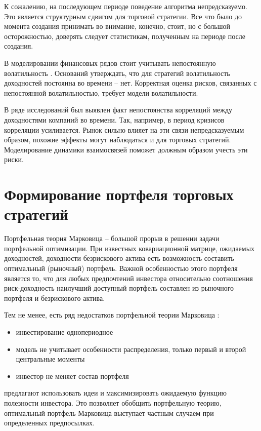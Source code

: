 К сожалению, на последующем периоде поведение алгоритма непредсказуемо. Это является структурным сдвигом для торговой стратегии. Все что было до момента создания принимать во внимание, конечно, стоит, но с большой осторожностью, доверять следует статистикам, полученным на периоде после создания.
 
В моделировании финансовых рядов стоит учитывать непостоянную волатильность \citep{dumas1998}. Оснований утверждать, что для стратегий волатильность доходностей постоянна во времени -- нет. Корректная оценка рисков, связанных с непостоянной волатильностью, требует модели волатильности.

В ряде исследований \citep{vaga1990, oral2017} был выявлен факт непостоянства корреляций между доходностями компаний во времени. Так, например, в период кризисов корреляции усиливается. Рынок сильно влияет на эти связи непредсказуемым образом, похожие эффекты могут наблюдаться и для торговых стратегий. Моделирование динамики взаимосвязей поможет должным образом учесть эти риски.
\section{Формирование портфеля торговых стратегий}
Портфельная теория Марковица \citep{markovitz1959} -- большой прорыв в решении задачи портфельной оптимизации. При известных ковариационной матрице, ожидаемых доходностей, доходности безрискового актива есть возможность составить оптимальный (рыночный) портфель. Важной особенностью этого портфеля является то, что для любых предпочтений инвестора относительно соотношения риск-доходность наилучший доступный портфель составлен из рыночного портфеля и безрискового актива.

Тем не менее, есть ряд недостатков портфельной теории Марковица \citep{lorenz2008thesis}:
\begin{itemize}
	\item инвестирование однопериодное
	\item модель не учитывает особенности распределения, только первый и второй центральные моменты
	\item инвестор не меняет состав портфеля
\end{itemize}

\cite{lorenz2008thesis, bucciol2006} предлагают использовать идеи \cite{neumann1944} и максимизировать ожидаемую функцию полезности инвестора. Это позволяет обобщить портфельную теорию, оптимальный портфель Марковица выступает частным случаем при определенных предпосылках.

